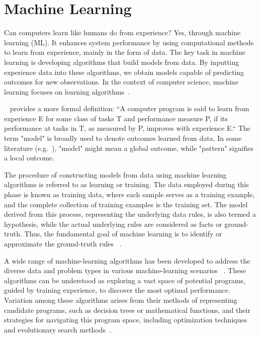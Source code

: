\section{Machine Learning}
\label{sec:intro:motivation}

Can computers learn like humans do from experience? Yes, through machine learning (ML).
It enhances system performance by using computational methods to learn 
from experience, mainly in the form of data. The key task in machine learning is developing
algorithms that build models from data. By inputting experience data into these algorithms,
we obtain models capable of predicting outcomes for new observations. In the context of
computer science, machine learning focuses on learning algorithms~\cite{zhou2021machine}.


~\cite{mitchell1997machine} provides a more formal definition: 
``A computer program is said to learn from experience E for some class of tasks T and performance measure P, 
if its performance at tasks in T, as measured by P, improves with experience E.``
The term "model" is broadly used to denote outcomes learned from data. In some literature 
(e.g.~\cite{hand2001principles}), "model" might mean a global outcome, while "pattern" signifies a local outcome.

The procedure of constructing models from data using machine learning algorithms is referred to as learning or training. The data employed during this phase is known as training data, where each sample serves as a training example, and the complete collection of training examples is the training set. The model derived from this process, representing the underlying data rules, is also termed a hypothesis, while the actual underlying rules are considered as facts or ground-truth. Thus, the fundamental goal of machine learning is to identify or approximate the ground-truth rules ~\cite{zhou2021machine}.

A wide range of machine-learning algorithms has been developed to address the diverse data and problem types in various machine-learning scenarios ~\cite{hastie2009elements, murphy2012machine}. These algorithms can be understood as exploring a vast space of potential programs, guided by training experience, to discover the most optimal performance. Variation among these algorithms arises from their methods of representing candidate programs, such as decision trees or mathematical functions, and their strategies for navigating this program space, including optimization techniques and evolutionary search methods~\cite{jordan2015machine}.

